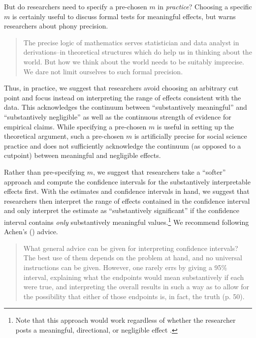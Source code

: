 \documentclass[12pt]{article}
\begin{document}
But do researchers need to specify a pre-chosen $m$ in \emph{practice}? Choosing a specific $m$ is certainly useful to discuss formal tests for meaningful effects, but \citet[pp. 101-102]{Tukey1991} warns researchers about phony precision.

\begin{quote}
The precise logic of mathematics serves statistician and data analyst in derivations--in theoretical structures which do help us in thinking about the world. But how we think about the world needs to be suitably imprecise. We dare not limit ourselves to such formal precision.
\end{quote}

\noindent Thus, in practice, we suggest that researchers avoid choosing an arbitrary cut point and focus instead on interpreting the range of effects consistent with the data. This acknowledges the continuum between ``substantively meaningful'' and ``substantively negligible'' as well as the continuous strength of evidence for empirical claims. While specifying a pre-chosen $m$ is useful in setting up the theoretical argument, such a pre-chosen $m$ is artificially precise for social science practice and does not sufficiently acknowledge the continuum (as opposed to a cutpoint) between meaningful and negligible effects.

Rather than pre-specifying $m$, we suggest that researchers take a ``softer'' approach and compute the confidence intervals for the substantively interpretable effects first. With the estimates and confidence intervals in hand, we suggest that researchers then interpret the range of effects contained in the confidence interval and only interpret the estimate as ``substantively significant'' if the confidence interval contains \emph{only} substantively meaningful values.\footnote{\normalbaselineskip Note that this approach would work regardless of whether the researcher posts a meaningful, directional, or negligible effect \citep{Rainey2014}.} We recommend following Achen's (\citeyear{Achen1982}) advice.

\begin{quote}
What general advice can be given for interpreting confidence intervals? The best use of them depends on the problem at hand, and no universal instructions can be given. However, one rarely errs by giving a 95\% interval, explaining what the endpoints would mean substantively if each were true, and interpreting the overall results in such a way as to allow for the possibility that either of those endpoints is, in fact, the truth (p. 50).
\end{quote}
\end{document}
